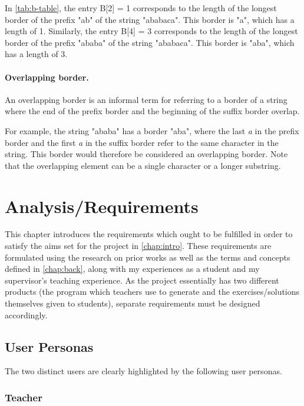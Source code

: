 \documentclass{l4proj}
\begin{document}
In \autoref{tab:b-table}, the entry B[2] = 1 corresponds to the length of the longest border of the prefix "ab" of the string "ababaca". This border is "a", which has a length of 1. Similarly, the entry B[4] = 3 corresponds to the length of the longest border of the prefix "ababa" of the string "ababaca". This border is "aba", which has a length of 3.

\subsubsection{Overlapping border.}
An overlapping border is an informal term for referring to a border of a string where the end of the prefix border and the beginning of the suffix border overlap.

For example, the string "ababa" has a border "aba", where the last \emph{a} in the prefix border and the first \emph{a} in the suffix border refer to the same character in the string. This border would therefore be considered an overlapping border. Note that the overlapping element can be a single character or a longer substring.


\chapter{Analysis/Requirements}
\label{chap:req}

This chapter introduces the requirements which ought to be fulfilled in order to satisfy the aims set for the project in \autoref{chap:intro}. These requirements are formulated using the research on prior works as well as the terms and concepts defined in \autoref{chap:back}, along with my experiences as a student and my supervisor's teaching experience. As the project essentially has two different products (the program which teachers use to generate and the exercises/solutions themselves given to students), separate requirements must be designed accordingly.
\section{User Personas}

The two distinct users are clearly highlighted by the following user personas.

\subsection{Teacher}
\end{document}

